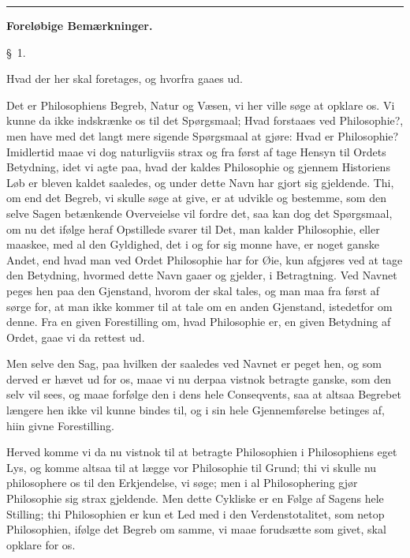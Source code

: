 \documentclass[12pt,a4paper]{book}
\newcommand{\grouphead}[1]{%
  \bigskip\begin{center}\large\textbf{#1}\end{center}\smallskip}
\newcommand{\apage}[1]{\marginnote{\footnotesize\textit{[#1]}}}
\begin{document}
\begin{center}\rule{0.18\linewidth}{0.4pt}\end{center}

\mainmatter

\grouphead{Foreløbige Bemærkninger.}

\apage{1} \begin{center}\large\S~1.\end{center}
\begin{center}Hvad der her skal foretages, og hvorfra gaaes ud.\end{center}

Det er Philosophiens Begreb, Natur og Væsen, vi her ville søge at opklare os.
Vi kunne da ikke indskrænke os til det Spørgsmaal; Hvad forstaaes ved
Philosophie?, men have med det langt mere sigende Spørgsmaal at gjøre: Hvad er
Philosophie? Imidlertid maae vi dog naturligviis strax og fra først af tage
Hensyn til Ordets Betydning, idet vi agte paa, hvad der kaldes Philosophie og
gjennem Historiens Løb er bleven kaldet saaledes, og under dette Navn har
gjort sig gjeldende. Thi, om end det Begreb, vi skulle søge at give, er at
udvikle og bestemme, som den selve Sagen betænkende Overveielse vil fordre
det, saa kan dog det Spørgsmaal, om nu det ifølge heraf Opstillede svarer til
Det, man kalder Philosophie, eller maaskee, med al den Gyldighed, det i og for
sig monne have, er noget ganske Andet, end hvad man ved Ordet Philosophie har
for Øie, kun afgjøres ved at tage den Betydning, hvormed dette Navn gaaer og
gjelder, i Betragtning. Ved Navnet peges hen paa den Gjenstand, hvorom der
skal tales, og man maa fra først af sørge for, at man ikke kommer til at tale
om en anden Gjenstand, istedetfor om denne. Fra en given Forestilling om, hvad
Philosophie er, en given Betydning af Ordet, gaae vi da rettest ud.

Men selve den Sag, paa hvilken der saaledes ved Navnet er peget hen, og som
derved er hævet ud for os, maae vi nu derpaa vistnok betragte ganske, som den
selv vil sees,  \apage{2} og maae forfølge den i dens hele Conseqvents, saa at altsaa
Begrebet længere hen ikke vil kunne bindes til, og i sin hele Gjennemførelse
betinges af, hiin givne Forestilling.

Herved komme vi da nu vistnok til at betragte Philosophien i Philosophiens
eget Lys, og komme altsaa til at lægge vor Philosophie til Grund; thi vi
skulle nu philosophere os til den Erkjendelse, vi søge; men i al Philosophering
gjør Philosophie sig strax gjeldende. Men dette Cykliske er en Følge af Sagens
hele Stilling; thi Philosophien er kun et Led med i den Verdenstotalitet, som
netop Philosophien, ifølge det Begreb om samme, vi maae forudsætte som givet,
skal opklare for os.
\end{document}
